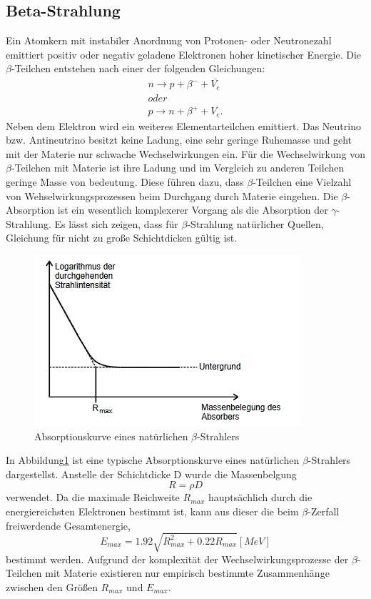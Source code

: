 \subsection{Beta-Strahlung}
Ein Atomkern mit instabiler Anordnung von Protonen- oder Neutronezahl emittiert positiv oder negativ geladene Elektronen hoher kinetischer Energie.
Die $\beta$-Teilchen entstehen nach einer der folgenden Gleichungen:
\begin{eqnarray}
n \rightarrow p + \beta^- + \bar{V_e} \\
\nonumber
oder\\
p \rightarrow n + \beta^+ + V_e .
\end{eqnarray}
Neben dem Elektron wird ein weiteres Elementarteilchen emittiert.
Das Neutrino bzw. Antineutrino besitzt keine Ladung, eine sehr geringe Ruhemasse und geht mit der Materie nur schwache Wechselwirkungen ein.
Für die Wechselwirkung von $\beta$-Teilchen mit Materie ist ihre Ladung und im Vergleich zu anderen Teilchen geringe Masse von bedeutung.
Diese führen dazu, dass $\beta$-Teilchen eine Vielzahl von Wehselwirkungsprozessen beim Durchgang durch Materie eingehen.
Die $\beta$-Absorption ist ein wesentlich komplexerer Vorgang als die Absorption der $\gamma$-Strahlung.
Es lässt sich zeigen, dass für $\beta$-Strahlung natürlicher Quellen, Gleichung für nicht zu große Schichtdicken gültig ist.
\begin{figure}[H]
    \centering
    \includegraphics[width=\textwidth]{content/Absorbbeta.png}
    \caption{Absorptionskurve eines natürlichen $\beta$-Strahlers}
    \label{fig:abs}
\end{figure}
\noindent
In Abbildung\ref{fig:abs} ist eine typische Absorptionskurve eines natürlichen $\beta$-Strahlers dargestellst.
Anstelle der Schichtdicke D wurde die Massenbelgung
\begin{equation}
  R = \rho D
\end{equation}
verwendet.
Da die maximale Reichweite $R_{max}$ hauptsächlich durch die energiereichsten Elektronen bestimmt ist, kann aus dieser die beim $\beta$-Zerfall freiwerdende Gesamtenergie,
\begin{equation}
  E_{max}= 1.92  \sqrt{R_{max}^2 +0.22R_{max}} [MeV]
\end{equation}
bestimmt werden.
Aufgrund der komplexität der Wechselwirkungsprozesse der $\beta$-Teilchen mit Materie existieren nur empirisch bestimmte Zusammenhänge zwischen den Größen $R_{max}$ und $E_{max}$.
